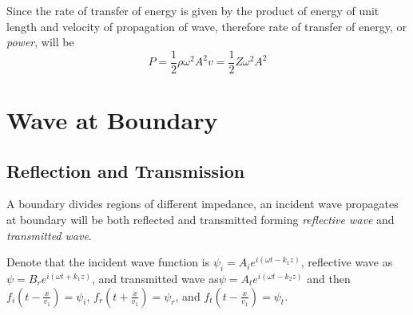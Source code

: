 \documentclass[UTF8]{book}
\begin{document}
Since the rate of transfer of energy is given by the product of energy of unit length and velocity of propagation of wave, therefore rate of transfer of energy, or \emph{power}, will be
\[P=\frac{1}{2}\rho \omega ^2A^2v=\frac{1}{2}Z\omega ^2A^2\]


\section{Wave at Boundary}


\subsection{Reflection and Transmission}
A boundary divides regions of different impedance, an incident wave propagates at boundary will be both reflected and transmitted forming \emph{reflective wave} and \emph{transmitted wave}.

Denote that the incident wave function is $\psi _i=A_ie^{i(\omega t-k_1z)}$, reflective wave as $\psi =B_re^{i(\omega t+k_1z)}$, and transmitted wave as$\psi =A_te^{i(\omega t-k_2z)}$ and then $f_i(t-\frac{x}{v_1})=\psi _i$, $f_r(t+\frac{x}{v_1})=\psi _r$, and $f_t(t-\frac{x}{v_1})=\psi _t$.
\end{document}
